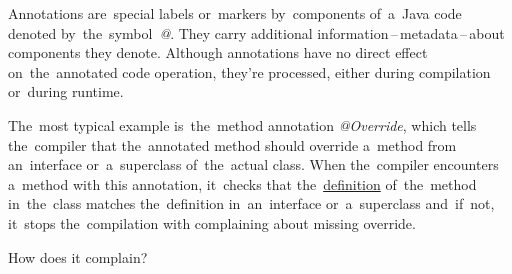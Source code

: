 
\label{javaannotation}
Annotations are~special labels or~markers by~components of~a~Java code denoted by~the~symbol~\textquotesingle\textit{@}\textquotesingle. They carry additional information\,--\,metadata\,--\,about components they denote. Although annotations have no direct effect on~the~annotated code operation, they're processed, either during compilation or~during runtime.

The~most typical example is~the~method annotation \textit{@Override}, which tells the~compiler that the~annotated method should override a~method from an~interface or~a~superclass of~the~actual class. When the~compiler encounters a~method with this annotation, it~checks that the~\hyperref[definitiondeclaration]{definition} of~the~method in~the~class matches the~definition in~an~interface or~a~superclass and~if~not, it~stops the~compilation with complaining about missing override.

\todo How does it complain?

\label{annotationsrepeatable}


\label{reflection}